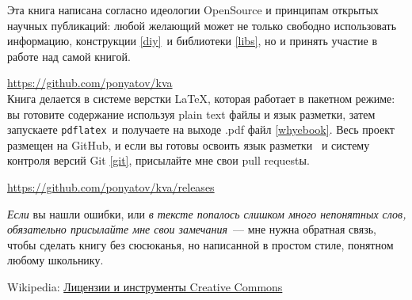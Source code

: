 

\bigskip

\noindent
Эта книга написана согласно идеологии OpenSource и принципам открытых научных
публикаций: любой желающий может не только свободно использовать информацию,
конструкции \ref{diy}\ и библиотеки \ref{libs}, но и принять участие в работе
над самой книгой. \licence


\bigskip
\url{https://github.com/ponyatov/kva}\\

\clearpage 
Книга делается в системе верстки \LaTeX{}, которая работает в пакетном
режиме:
вы готовите содержание используя plain text файлы и язык разметки, затем
запускаете \verb|pdflatex|\ и получаете на выходе .pdf файл \ref{whyebook}. Весь
проект размещен на GitHub, и если вы готовы освоить язык разметки
\cite{lvovsky}\ и систему контроля версий Git \ref{git}, присылайте мне свои
pull requestы.

\medskip 
\url{https://github.com/ponyatov/kva/releases}

\bigskip
\emph{Если} вы нашли ошибки, или \emph{в тексте попалось слишком много
непонятных слов, обязательно присылайте мне свои замечания}\ --- мне нужна
обратная связь, чтобы сделать книгу без сюсюканья, но написанной в простом
стиле, понятном любому школьнику.



\clearpage

\label{whynd}

Wikipedia:
\href{https://ru.wikipedia.org/wiki/%D0%9B%D0%B8%D1%86%D0%B5%D0%BD%D0%B7%D0%B8%D0%B8_%D0%B8_%D0%B8%D0%BD%D1%81%D1%82%D1%80%D1%83%D0%BC%D0%B5%D0%BD%D1%82%D1%8B_Creative_Commons}{Лицензии и инструменты Creative Commons}
\bigskip

